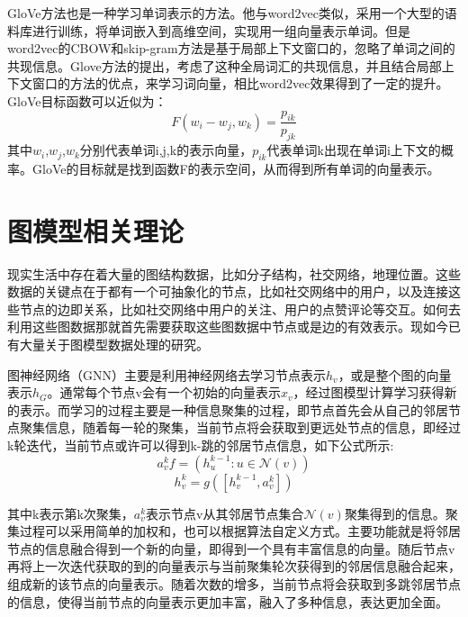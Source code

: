 GloVe方法也是一种学习单词表示的方法。他与word2vec类似，采用一个大型的语料库进行训练，将单词嵌入到高维空间，实现用一组向量表示单词。但是word2vec的CBOW和skip-gram方法是基于局部上下文窗口的，忽略了单词之间的共现信息。Glove方法的提出，考虑了这种全局词汇的共现信息，并且结合局部上下文窗口的方法的优点，来学习词向量，相比word2vec效果得到了一定的提升。
GloVe目标函数可以近似为：
\begin{equation}\label{CBOWFormula1}
	F\left(w_i-w_j,w_k\right)=\frac{p_{ik}}{p_{jk}}
\end{equation}
其中$w_i$,$w_j$,$w_k$分别代表单词i,j,k的表示向量，$p_{ik}$代表单词k出现在单词i上下文的概率。GloVe的目标就是找到函数F的表示空间，从而得到所有单词的向量表示。
\section{图模型相关理论}
现实生活中存在着大量的图结构数据，比如分子结构，社交网络，地理位置。这些数据的关键点在于都有一个可抽象化的节点，比如社交网络中的用户，以及连接这些节点的边即关系，比如社交网络中用户的关注、用户的点赞评论等交互。如何去利用这些图数据那就首先需要获取这些图数据中节点或是边的有效表示。现如今已有大量关于图模型数据处理的研究。

图神经网络（GNN）主要是利用神经网络去学习节点表示$h_v$，或是整个图的向量表示$h_G$。通常每个节点v会有一个初始的向量表示$x_v$，经过图模型计算学习获得新的表示。而学习的过程主要是一种信息聚集的过程，即节点首先会从自己的邻居节点聚集信息，随着每一轮的聚集，当前节点将会获取到更远处节点的信息，即经过k轮迭代，当前节点或许可以得到k-跳的邻居节点信息，如下公式所示:
\begin{equation}\label{GNNFormula1}
	a_v^kf=\left(h_u^{k-1}:u\in\mathcal{N}\left(v\right)\right)
\end{equation}
\begin{equation}\label{GNNFormula2}
	h_v^k=g\left(\left[h_v^{k-1},a_v^k\right]\right)
\end{equation}

其中k表示第k次聚集，$a_v^k$表示节点v从其邻居节点集合$\mathcal{N}\left(v\right)$聚集得到的信息。聚集过程可以采用简单的加权和，也可以根据算法自定义方式。主要功能就是将邻居节点的信息融合得到一个新的向量，即得到一个具有丰富信息的向量。随后节点v再将上一次迭代获取的到的向量表示与当前聚集轮次获得到的邻居信息融合起来，组成新的该节点的向量表示。随着次数的增多，当前节点将会获取到多跳邻居节点的信息，使得当前节点的向量表示更加丰富，融入了多种信息，表达更加全面。

